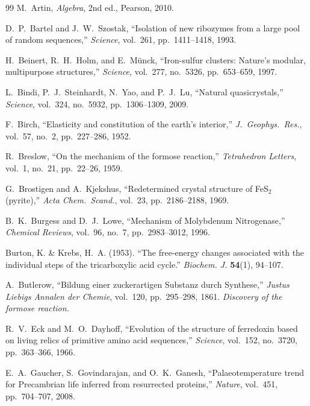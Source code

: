 \vspace{2em}
\begin{thebibliography}{99}
M.~Artin,
\emph{Algebra},
2nd ed., Pearson, 2010.

D.~P.~Bartel and J.~W.~Szostak,
``Isolation of new ribozymes from a large pool of random sequences,''
\emph{Science}, vol.~261, pp.~1411--1418, 1993.

H.~Beinert, R.~H.~Holm, and E.~M\"unck,
``Iron-sulfur clusters: Nature's modular, multipurpose structures,''
\emph{Science}, vol.~277, no.~5326, pp.~653--659, 1997.

L.~Bindi, P.~J.~Steinhardt, N.~Yao, and P.~J.~Lu,
``Natural quasicrystals,''
\emph{Science}, vol.~324, no.~5932, pp.~1306--1309, 2009.

F.~Birch,
``Elasticity and constitution of the earth's interior,''
\emph{J.\ Geophys.\ Res.}, vol.~57, no.~2, pp.~227--286, 1952.

R.~Breslow,
``On the mechanism of the formose reaction,''
\emph{Tetrahedron Letters}, vol.~1, no.~21, pp.~22--26, 1959.

G.~Brostigen and A.~Kjekshus,
``Redetermined crystal structure of FeS$_2$ (pyrite),''
\emph{Acta Chem.\ Scand.}, vol.~23, pp.~2186--2188, 1969.

B.~K.~Burgess and D.~J.~Lowe,
``Mechanism of Molybdenum Nitrogenase,''
\emph{Chemical Reviews}, vol.~96, no.~7, pp.~2983--3012, 1996.

Burton, K. \& Krebs, H.~A. (1953).
``The free-energy changes associated with the individual steps of the tricarboxylic acid cycle.''
\textit{Biochem. J.} \textbf{54}(1), 94--107.

A.~Butlerow,
``Bildung einer zuckerartigen Substanz durch Synthese,''
\emph{Justus Liebigs Annalen der Chemie}, vol.~120, pp.~295--298, 1861.
\textit{Discovery of the formose reaction.}

R.~V.~Eck and M.~O.~Dayhoff,
``Evolution of the structure of ferredoxin based on living relics of primitive amino acid sequences,''
\emph{Science}, vol.~152, no.~3720, pp.~363--366, 1966.

E.~A.~Gaucher, S.~Govindarajan, and O.~K.~Ganesh,
``Palaeotemperature trend for Precambrian life inferred from resurrected proteins,''
\emph{Nature}, vol.~451, pp.~704--707, 2008.


\end{thebibliography}
